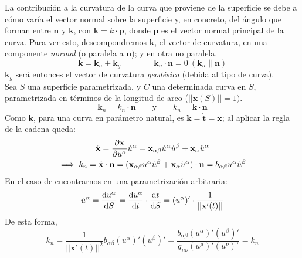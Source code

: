 La contribución a la curvatura de la curva que proviene de la superficie se debe a cómo varía el vector normal sobre la superficie y, en concreto, del ángulo que forman entre $\mathbf{n}$ y $\mathbf{k}$, con $\mathbf{k}=k\cdot \mathbf{p}$, donde $\mathbf{p}$ es el vector normal principal de la curva. Para ver esto, descompondremos $\mathbf{k}$, el vector de curvatura, en una componente \emph{normal} (o paralela a $\mathbf{n}$); y en otra no paralela.\\
$$
\mathbf{k}=\mathbf{k}_n+\mathbf{k}_g \qquad \qquad \mathbf{k}_n\cdot \mathbf{n}=0 \ (\mathbf{k}_n\parallel \mathbf{n})
$$
$\mathbf{k}_g$ será entonces el vector de curvatura \emph{geodésica} (debida al tipo de curva). \\

Sea $S$ una superficie parametrizada, y $C$ una determinada curva en $S$, parametrizada en términos de la longitud de arco ($||\dot{\mathbf{x}}(S)||=1)$.
$$
\mathbf{k}_n=k_n\cdot \mathbf{n} \qquad \text{y} \qquad k_n=\mathbf{k}\cdot \mathbf{n}
$$
Como $\mathbf{k}$, para una curva en parámetro natural, es $\mathbf{k}=\dot{\mathbf{t}}=\ddot{\mathbf{x}}$; al aplicar la regla de la cadena queda:
\begin{gather*}
    \ddot{\mathbf{x}}=\pdv{\mathbf{x}}{u^\alpha }\dot{u}^\alpha =\mathbf{x}_{\alpha \beta }\dot{u}^\alpha \dot{u}^\beta +\mathbf{x}_\alpha \ddot{u}^\alpha \\
    \implies k_n=\ddot{\mathbf{x}}\cdot \mathbf{n}=(\mathbf{x}_{\alpha \beta }\dot{u}^\alpha \dot{u}^\beta +\mathbf{x}_\alpha \ddot{u}^\alpha)\cdot \mathbf{n}=b_{\alpha \beta }\dot{u}^\alpha \dot{u}^\beta 
\end{gather*}
En el caso de encontrarnos en una parametrización arbitraria:
$$
\dot{u}^\alpha =\dv{u^\alpha }{S}=\dv{u^\alpha }{t}\cdot \dv{t}{S}=(u^\alpha )'\cdot \frac{1}{||\mathbf{x}'(t)||}
$$
De esta forma, 
$$
k_n=\frac{1}{||\mathbf{x}'(t)||^2}b_{\alpha \beta }(u^\alpha )'(u^\beta)'=\boxed{\frac{b_{\alpha \beta }(u^\alpha )'(u^\beta )'}{g_{\mu \nu }(u^\mu )'(u^\nu )'}=k_n}
$$

